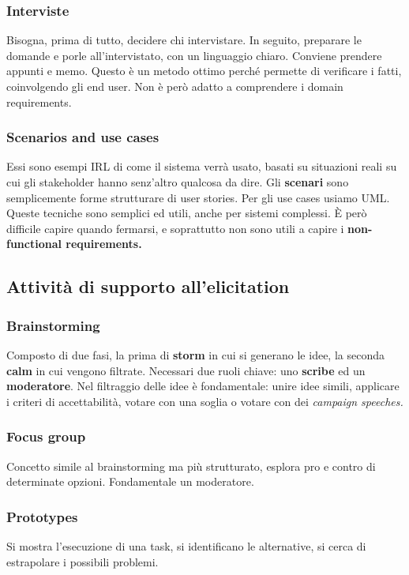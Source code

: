 \documentclass[11pt]{article}
\begin{document}
\subsubsection{Interviste}
Bisogna, prima di tutto, decidere chi intervistare. In seguito, preparare le domande e porle all'intervistato, con un linguaggio chiaro. Conviene prendere appunti e memo. Questo è un metodo ottimo perché permette di verificare i fatti, coinvolgendo gli end user. Non è però adatto a comprendere i domain requirements.
\subsubsection{Scenarios and use cases}
Essi sono esempi IRL di come il sistema verrà usato, basati su situazioni reali su cui gli stakeholder hanno senz'altro qualcosa da dire. Gli \textbf{scenari} sono semplicemente forme strutturare di user stories. Per gli use cases usiamo UML. Queste tecniche sono semplici ed utili, anche per sistemi complessi. È però difficile capire quando fermarsi, e soprattutto non sono utili a capire i \textbf{non-functional requirements.}
\subsection{Attività di supporto all'elicitation}
\subsubsection{Brainstorming}
Composto di due fasi, la prima di \textbf{storm} in cui si generano le idee, la seconda \textbf{calm} in cui vengono filtrate. Necessari due ruoli chiave: uno \textbf{scribe} ed un \textbf{moderatore}.
Nel filtraggio delle idee è fondamentale: unire idee simili, applicare i criteri di accettabilità, votare con una soglia o votare con dei \textit{campaign speeches.}
\subsubsection{Focus group}
Concetto simile al brainstorming ma più strutturato, esplora pro e contro di determinate opzioni. Fondamentale un moderatore.
\subsubsection{Prototypes}
Si mostra l'esecuzione di una task, si identificano le alternative, si cerca di estrapolare i possibili problemi. 
\end{document}
